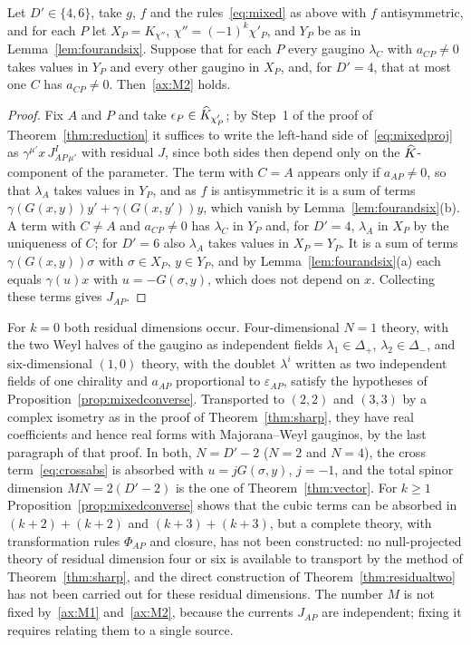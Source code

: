 \begin{proposition}
\label{prop:mixedconverse}
Let $D'\in\{4,6\}$, take $g$, $f$ and the rules~\eqref{eq:mixed} as above with $f$ antisymmetric, and for each $P$ let $X_P=K_{\chi''}$, $\chi''=(-1)^k\chi'_P$, and $Y_P$ be as in Lemma~\ref{lem:fourandsix}. Suppose that for each $P$ every gaugino $\lambda_C$ with $a_{CP}\ne0$ takes values in $Y_P$ and every other gaugino in $X_P$, and, for $D'=4$, that at most one $C$ has $a_{CP}\ne0$. Then~\ref{ax:M2} holds.
\end{proposition}

\begin{proof}
Fix $A$ and $P$ and take $\epsilon_P\in\widehat{K}_{\chi'_P}$; by Step~1 of the proof of Theorem~\ref{thm:reduction} it suffices to write the left-hand side of~\eqref{eq:mixedproj} as $\gamma^{\mu'}x\,J^I_{AP\,\mu'}$ with residual $J$, since both sides then depend only on the $\widehat{K}$-component of the parameter. The term with $C=A$ appears only if $a_{AP}\ne0$, so that $\lambda_A$ takes values in $Y_P$, and as $f$ is antisymmetric it is a sum of terms $\gamma(G(x,y))y'+\gamma(G(x,y'))y$, which vanish by Lemma~\ref{lem:fourandsix}(b). A term with $C\ne A$ and $a_{CP}\ne0$ has $\lambda_C$ in $Y_P$ and, for $D'=4$, $\lambda_A$ in $X_P$ by the uniqueness of $C$; for $D'=6$ also $\lambda_A$ takes values in $X_P=Y_P$. It is a sum of terms $\gamma(G(x,y))\sigma$ with $\sigma\in X_P$, $y\in Y_P$, and by Lemma~\ref{lem:fourandsix}(a) each equals $\gamma(u)x$ with $u=-G(\sigma,y)$, which does not depend on $x$. Collecting these terms gives $J_{AP}$.
\end{proof}

\begin{remark}
\label{rem:mixedsharp}
For $k=0$ both residual dimensions occur. Four-dimensional $N=1$ theory, with the two Weyl halves of the gaugino as independent fields $\lambda_1\in\Delta_+$, $\lambda_2\in\Delta_-$, and six-dimensional $(1,0)$ theory, with the doublet $\lambda^i$ written as two independent fields of one chirality and $a_{AP}$ proportional to $\varepsilon_{AP}$, satisfy the hypotheses of Proposition~\ref{prop:mixedconverse}. Transported to $(2,2)$ and $(3,3)$ by a complex isometry as in the proof of Theorem~\ref{thm:sharp}, they have real coefficients and hence real forms with Majorana--Weyl gauginos, by the last paragraph of that proof. In both, $N=D'-2$ ($N=2$ and $N=4$), the cross term~\eqref{eq:crossabs} is absorbed with $u=jG(\sigma,y)$, $j=-1$, and the total spinor dimension $MN=2(D'-2)$ is the one of Theorem~\ref{thm:vector}. For $k\ge1$ Proposition~\ref{prop:mixedconverse} shows that the cubic terms can be absorbed in $(k+2)+(k+2)$ and $(k+3)+(k+3)$, but a complete theory, with transformation rules $\Phi_{AP}$ and closure, has not been constructed: no null-projected theory of residual dimension four or six is available to transport by the method of Theorem~\ref{thm:sharp}, and the direct construction of Theorem~\ref{thm:residualtwo} has not been carried out for these residual dimensions. The number $M$ is not fixed by~\ref{ax:M1} and~\ref{ax:M2}, because the currents $J_{AP}$ are independent; fixing it requires relating them to a single source.
\end{remark}

